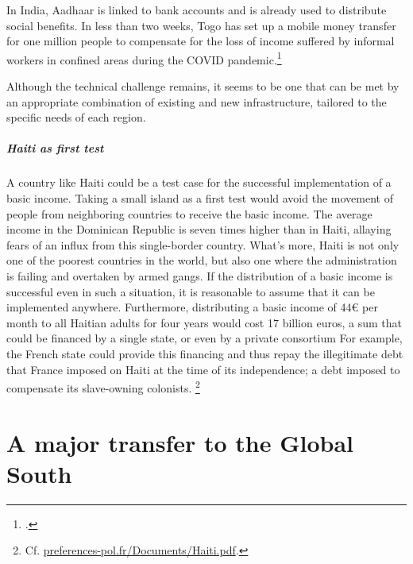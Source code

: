 \documentclass[a5paper,english,openany]{memoir}
\begin{document}
In India, Aadhaar is linked to bank accounts and is %
already used to distribute social benefits. In less than two weeks, Togo has set up a mobile money transfer for one million people to compensate for the loss of income suffered by informal workers in confined areas during the COVID pandemic.\footnote{\citet{ipa_togos_2021}.} 

Although the technical challenge remains, it seems to be one that can be met by an appropriate combination of existing and new infrastructure, tailored to the specific needs of each region. 

\paragraph{Haiti as first test}
A country like Haiti could be a test case for the successful implementation of a basic income. Taking a small island as a first test would avoid the movement of people from neighboring %
countries to receive the basic income. %
The average income in the Dominican Republic is seven times higher than in Haiti, allaying fears of an influx from this single-border %
country. %
What's more, Haiti is not only one of the poorest countries in the world, but also one where the administration is failing and overtaken by armed gangs. If the distribution of a basic income is successful even in such a situation, it is reasonable to assume that it can be implemented anywhere. %
Furthermore,%
distributing a basic income of 44\euro{} per month to all Haitian adults for four years would cost 17 billion euros, a sum that could be financed by a single state, %
or even by a private consortium %
For example, the French state could provide this financing and thus repay the illegitimate debt that France imposed on Haiti at the time of its independence;
a debt imposed to compensate its slave-owning colonists. %
\footnote{Cf. \href{http://preferences-pol.fr/Documents/Haïti.pdf}{preferences-pol.fr/Documents/Haiti.pdf}.}%


\chapter{A major transfer to the Global South\label{ch:effets_distributifs}}
\end{document}
